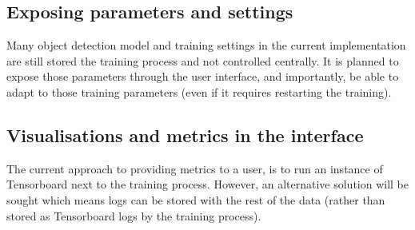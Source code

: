 \subsection {Exposing parameters and settings}
 Many object detection model and training settings in the current implementation are still stored the training process and not controlled centrally. It is planned to expose those parameters through the user interface, and importantly, be able to adapt to those training parameters (even if it requires restarting the training).

\subsection{Visualisations and metrics in the interface}

The current approach to providing metrics to a user, is to run an instance of Tensorboard next to the training process. However, an alternative solution will be sought which means logs can be stored with the rest of the data (rather than stored as Tensorboard logs by the training process).


